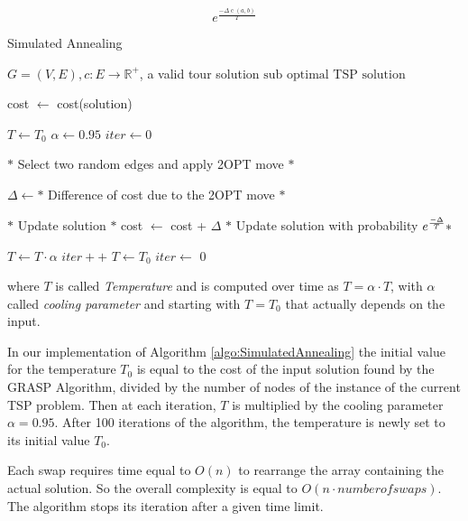 \begin{equation*}
    e^{\frac{-\Delta \operatorname{c}(a,b)}{T}}
\end{equation*}

\begin{algorithm}[!h]
    \caption{Simulated Annealing}\label{algo:SimulatedAnnealing}
    \begin{algorithmic}[1]
    \Require $G = (V,E), c:E \to \mathbb{R}^+$, a valid tour solution
    \Ensure $\text{sub optimal TSP solution}$

    \State cost $\gets$ cost(solution)

    \State $T \gets   T_0 $
    \State $ \alpha \gets  0.95 $
    \State $ iter \gets  0 $
   




    

    \State $*$ Select two random edges and apply 2OPT move $*$

    
    \State $\Delta \gets *$ Difference of cost due to the 2OPT move $*$  
    
    
    \State $*$ Update solution $*$
    \State cost $\gets$ cost + $\Delta$
    \Else 
    \State $*$ Update solution with probability $ e^{-\Delta \over T}*$

    \EndIf

    \State $T \gets T \cdot \alpha$
    \State $iter++ $
    \State $T \gets   T_0$
    \State $iter \gets  $ 0
    \EndIf
    

    \EndWhile

    \end{algorithmic}
\end{algorithm}

where $T$ is called \textit{Temperature} and is computed over time as $T = \alpha \cdot T$, with $\alpha$ called \textit{cooling parameter} and starting with $T = T_0$ that actually depends on the input.

In our implementation of Algorithm \ref{algo:SimulatedAnnealing} the initial value for the temperature $T_0$ is equal to the cost of the input solution found by the GRASP Algorithm, divided by the number of nodes of the instance of the current TSP problem. Then at each iteration, $T$ is multiplied by the cooling parameter $\alpha = 0.95$. After 100 iterations of the algorithm, the temperature is newly set to its initial value $T_0$.

Each swap requires time equal to $O(n)$ to rearrange the array containing the actual solution. So the overall complexity is equal to $O(n \cdot number of swaps)$.
The algorithm stops its iteration after a given time limit.

